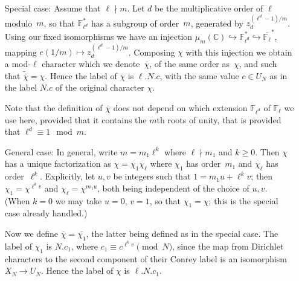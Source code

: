 \documentclass[a4paper, 10pt]{amsart}
\def\C{{\mathbb C}}
\def\Fl{{\mathbb F}_{\ell}}
\def\Fld{{\mathbb F}_{\ell^d}}
\def\Flbar{\overline{{\mathbb F}_{\ell}}}
\newcommand{\CLab}[2]{$#1.#2$}
\newcommand{\DLab}[3]{$#1.#2.#3$}
\begin{document}
\begin{itemize}
  \item[Special case:] Assume that $\ell\nmid m$. Let $d$ be the
    multiplicative order of $\ell$ modulo~$m$, so that $\Fld^*$ has a
    subgroup of order~$m$, generated by $z_d^{(\ell^d-1)/m}$.  Using
    our fixed isomorphisms we have an injection
    $\mu_m(\C)\hookrightarrow\Fld^*\hookrightarrow\Flbar^*$, mapping
    $e(1/m)\mapsto z_d^{(\ell^d-1)/m}$.  Composing $\chi$ with this
    injection we obtain a mod-$\ell$ character which we
    denote~$\overline{\chi}$, of the same order as~$\chi$, and such
    that $\tilde{\overline{\chi}}=\chi$.  Hence the label of
    $\overline{\chi}$ is \DLab{\ell}{N}{c}, with the same value
    $c\in U_N$ as in the label \CLab{N}{c} of the original character
    $\chi$.

    Note that the definition of $\overline{\chi}$ does not depend on
    which extension $\Fld$ of $\Fl$ we use here, provided that it
    contains the $m$th roots of unity, that is provided that
    $\ell^d\equiv1\mod{m}$.

    \item[General case:] In general, write $m=m_1\ell^k$ where
      $\ell\nmid m_1$ and $k\ge0$.  Then $\chi$ has a unique
      factorization as $\chi=\chi_1\chi_{\ell}$ where $\chi_1$ has
      order~$m_1$ and $\chi_{\ell}$ has order~$\ell^k$.  Explicitly,
      let $u,v$ be integers such that $1=m_1u+\ell^kv$; then
      $\chi_1=\chi^{\ell^kv}$ and $\chi_{\ell}=\chi^{m_1u}$, both
      being independent of the choice of $u,v$.  (When $k=0$ we may
      take $u=0$, $v=1$, so that $\chi_1=\chi$; this is the special
      case already handled.)

      Now we define $\overline{\chi}=\overline{\chi_1}$, the latter
      being defined as in the special case.  The label of $\chi_1$ is
      \CLab{N}{c_1}, where $c_1\equiv c^{\ell^kv}\pmod{N}$, since the
      map from Dirichlet characters to the second component of their
      Conrey label is an isomorphism $X_N\to U_N$.  Hence the label
      of $\chi$ is \DLab{\ell}{N}{c_1}.
\end{itemize}
\end{document}
